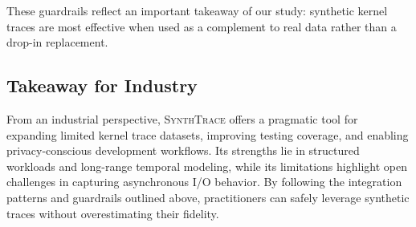 \begin{center}
\end{center}

These guardrails reflect an important takeaway of our study: synthetic kernel traces are most effective when used as a complement to real data rather than a drop-in replacement.

\subsection{Takeaway for Industry}

From an industrial perspective, \textsc{SynthTrace} offers a pragmatic tool for expanding limited kernel trace datasets, improving testing coverage, and enabling privacy-conscious development workflows. Its strengths lie in structured workloads and long-range temporal modeling, while its limitations highlight open challenges in capturing asynchronous I/O behavior. By following the integration patterns and guardrails outlined above, practitioners can safely leverage synthetic traces without overestimating their fidelity.